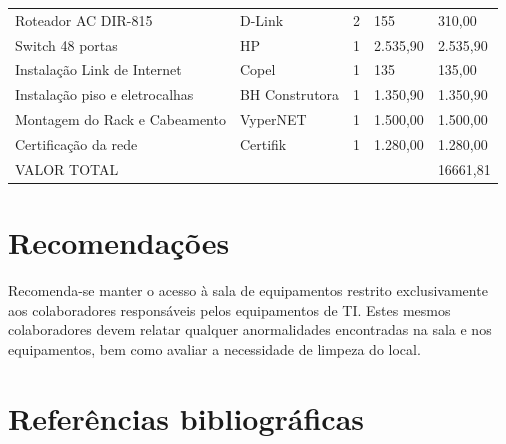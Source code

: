 \documentclass[	DIV=calc,%
paper=a4,%
fontsize=12pt,%
onecolumn]{scrartcl}	 					%
\begin{document}
\begin{table}[h!]
\begin{tabular}{lllll}
				Roteador AC DIR-815                   & D-Link         & 2          & 155      & 310,00   \\
				Switch 48 portas                      & HP             & 1          & 2.535,90 & 2.535,90 \\
				Instalação Link de Internet           & Copel          & 1          & 135      & 135,00   \\
				Instalação piso e eletrocalhas        & BH Construtora & 1          & 1.350,90 & 1.350,90 \\
				Montagem do Rack e Cabeamento         & VyperNET       & 1          & 1.500,00 & 1.500,00 \\
				Certificação da rede                  & Certifik       & 1          & 1.280,00 & 1.280,00 \\
				\bottomrule
				VALOR TOTAL                           &                &            &          & 16661,81\\
				\bottomrule
			\end{tabular}
	\end{table}
	
	\section{Recomendações}
	Recomenda-se manter o acesso à sala de equipamentos restrito exclusivamente aos colaboradores responsáveis pelos equipamentos de TI. Estes mesmos colaboradores devem relatar qualquer anormalidades encontradas na sala e nos equipamentos, bem como avaliar a necessidade de limpeza do local.
	
	\section{Referências bibliográficas}
	\renewcommand\refname{} %
	
	  
\end{document}
